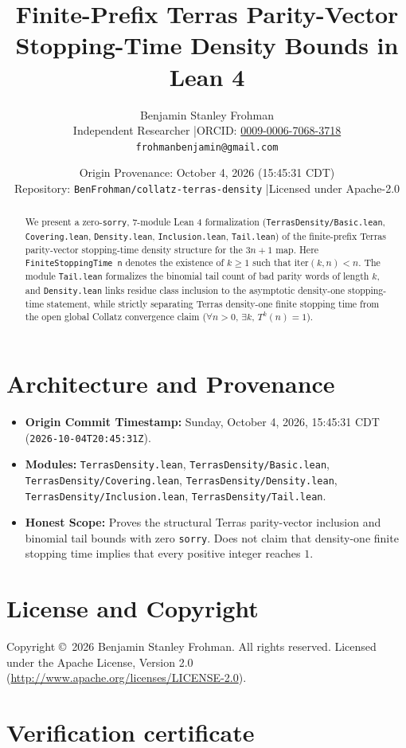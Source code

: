 \documentclass[11pt]{article}
\title{\textbf{Finite-Prefix Terras Parity-Vector Stopping-Time Density Bounds in Lean 4}}
\author{Benjamin Stanley Frohman\\
\small Independent Researcher \quad|\quad ORCID: \href{https://orcid.org/0009-0006-7068-3718}{0009-0006-7068-3718}\\
\small \texttt{frohmanbenjamin@gmail.com}}
\date{Origin Provenance: October 4, 2026 (15:45:31 CDT) \\ \small Repository: \texttt{BenFrohman/collatz-terras-density} \quad|\quad Licensed under Apache-2.0}
\begin{document}
\maketitle

\begin{abstract}
We present a zero-\texttt{sorry}, 7-module Lean 4 formalization (\texttt{TerrasDensity/Basic.lean}, \texttt{Covering.lean}, \texttt{Density.lean}, \texttt{Inclusion.lean}, \texttt{Tail.lean}) of the finite-prefix Terras parity-vector stopping-time density structure for the $3n+1$ map. Here \texttt{FiniteStoppingTime n} denotes the existence of $k \ge 1$ such that $\mathrm{iter}(k,n) < n$. The module \texttt{Tail.lean} formalizes the binomial tail count of bad parity words of length $k$, and \texttt{Density.lean} links residue class inclusion to the asymptotic density-one stopping-time statement, while strictly separating Terras density-one finite stopping time from the open global Collatz convergence claim ($\forall n > 0,\,\exists k,\,T^k(n)=1$).
\end{abstract}

\section{Architecture and Provenance}
\begin{itemize}
  \item \textbf{Origin Commit Timestamp:} Sunday, October 4, 2026, 15:45:31 CDT (\texttt{2026-10-04T20:45:31Z}).
  \item \textbf{Modules:} \texttt{TerrasDensity.lean}, \texttt{TerrasDensity/Basic.lean}, \texttt{TerrasDensity/Covering.lean}, \texttt{TerrasDensity/Density.lean}, \texttt{TerrasDensity/Inclusion.lean}, \texttt{TerrasDensity/Tail.lean}.
  \item \textbf{Honest Scope:} Proves the structural Terras parity-vector inclusion and binomial tail bounds with zero \texttt{sorry}. Does not claim that density-one finite stopping time implies that every positive integer reaches $1$.
\end{itemize}

\section*{License and Copyright}
Copyright \copyright\ 2026 Benjamin Stanley Frohman. All rights reserved. Licensed under the Apache License, Version 2.0 (\url{http://www.apache.org/licenses/LICENSE-2.0}).
\appendix
\section{Verification certificate}\label{app:verification-certificate}
\end{document}
